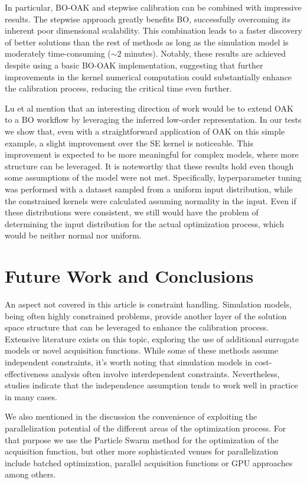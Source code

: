 \documentclass[sn-mathphys,Numbered]{sn-jnl}%
\begin{document}
In particular, BO-OAK and stepwise calibration can be combined with impressive results. The stepwise approach greatly benefits BO, successfully overcoming its inherent poor dimensional scalability. This combination leads to a faster discovery of better solutions than the rest of methods as long as the simulation model is moderately time-consuming ($\sim 2$ minutes). Notably, these results are achieved despite using a basic BO-OAK implementation, suggesting that further improvements in the kernel numerical computation could substantially enhance the calibration process, reducing the critical time even further.

Lu et al\cite{gp-additive-orthogonal} mention that an interesting direction of work would be to extend OAK to a BO workflow by leveraging the inferred low-order representation. In our tests we show that, even with a straightforward application of OAK on this simple example, a slight improvement over the SE kernel is noticeable. This improvement is expected to be more meaningful for complex models, where more structure can be leveraged. It is noteworthy that these results hold even though some assumptions of the model were not met. Specifically, hyperparameter tuning was performed with a dataset sampled from a uniform input distribution, while the constrained kernels were calculated assuming normality in the input. Even if these distributions were consistent, we still would have the problem of determining the input distribution for the actual optimization process, which would be neither normal nor uniform.

\section{Future Work and Conclusions}
An aspect not covered in this article is constraint handling. Simulation models, being often highly constrained problems, provide another layer of the solution space structure that can be leveraged to enhance the calibration process. Extensive literature exists on this topic, exploring the use of additional surrogate models or novel acquisition functions\cite{gp-constraints}. While some of these methods assume independent constraints, it's worth noting that simulation models in cost-effectiveness analysis often involve interdependent constraints. Nevertheless, studies indicate that the independence assumption tends to work well in practice in many cases\cite{bo-constraint-dependence}.

We also mentioned in the discussion the convenience of exploiting the parallelization potential of the different areas of the optimization process. For that purpose we use the Particle Swarm method for the optimization of the acquisition function, but other more sophisticated venues for parallelization include batched optimization\cite{gp-batch}, parallel acquisition functions\cite{gp-parallel-acq-func} or GPU approaches\cite{gp-gpu} among others.
\end{document}
